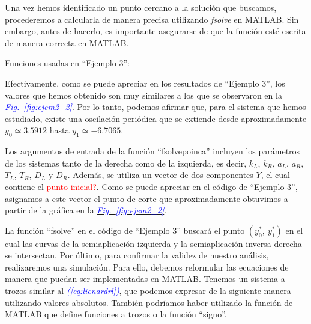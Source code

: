\documentclass[12pt,a4paper]{report} %
\newcommand{\fref}[1]{\hyperref[#1]{\textcolor{blue}{\textit{Fig.~\ref*{#1}}}}}
\newcommand{\eref}[1]{\hyperref[#1]{\textcolor{blue}{\textit{(\ref*{#1})}}}}
\begin{document}
	Una vez hemos identificado un punto cercano a la solución que buscamos, procederemos a calcularla de manera precisa utilizando \textit{fsolve} en MATLAB. Sin embargo, antes de hacerlo, es importante asegurarse de que la función esté escrita de manera correcta en MATLAB.
		
	\vspace{1cm}
	
	\vspace{1cm}
	
	\newpage
	
	\noindent Funciones usadas en ``Ejemplo 3'':
	\vspace{0.5cm}
	\vspace{0.5cm}
	
	\vspace{1cm}\noindent Efectivamente, como se puede apreciar en los resultados de ``Ejemplo 3'', los valores que hemos obtenido son muy similares a los que se observaron en la \fref{fig:ejem2_2}. Por lo tanto, podemos afirmar que, para el sistema que hemos estudiado, existe una oscilación periódica que se extiende desde aproximadamente $y_0\simeq3.5912$ hasta $y_1\simeq-6.7065$.

	
	\vspace{0.5cm}Los argumentos de entrada de la función ``fsolvepoinca'' incluyen los parámetros de los sistemas tanto de la derecha como de la izquierda, es decir, $k_L$, $k_R$, $a_L$, $a_R$, $T_L$, $T_R$, $D_L$ y $D_R$. Además, se utiliza un vector de dos componentes $Y$, el cual contiene el \textcolor{red}{punto inicial?}. Como se puede apreciar en el código de ``Ejemplo 3'', asignamos a este vector el punto de corte que aproximadamente obtuvimos a partir de la gráfica en la \fref{fig:ejem2_2}.
	
	
	\vspace{0.5cm}La función ``fsolve'' en el código de ``Ejemplo 3'' buscará el punto $\left(y_0^*,\: y_1^*\right)$ en el cual las curvas de la semiaplicación izquierda y la semiaplicación inversa derecha se intersectan.
	\newpage
	Por último, para confirmar la validez de nuestro análisis, realizaremos una simulación. Para ello, debemos reformular las ecuaciones de manera que puedan ser implementadas en MATLAB. Tenemos un sistema a trozos similar al \eref{eq:lienardrl}, que podemos expresar de la siguiente manera utilizando valores absolutos. También podríamos haber utilizado la función de MATLAB que define funciones a trozos o la función ``signo''.
	
\end{document}
